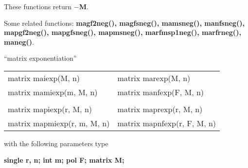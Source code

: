 These functions return {\bf $-$M}.

Some related functions:\hspace*{0.7em}
{\bf  magf2neg(), magfsneg(), mamsneg(), manfsneg(), \\
mapgf2neg(), mapgfsneg(), 
mapmsneg(), marfmsp1neg(), marfrneg(), maneg()}.

% 
% 

\newpage

\leer
\begin{center} ``matrix exponentiation'' \end{center}
\begin{center}
{\bf
\begin{tabular}{ll}
matrix maiexp(M, n)   & matrix marexp(M, n)   \\
matrix mamiexp(m, M, n)&  matrix manfexp(F, M, n) \\
&\\
matrix mapiexp(r, M, n)   & matrix maprexp(r, M, n) \\
matrix mapmiexp(r, m, M, n) & matrix mapnfexp(r, F, M, n) \\
\end{tabular} }
\end{center}
\parbox[t]{2.5in}{with the following parameters type}
\parbox[t]{3.0in}{
\bf single r, n;\newline
    int m;\newline
    pol F;\newline
    matrix M;}

